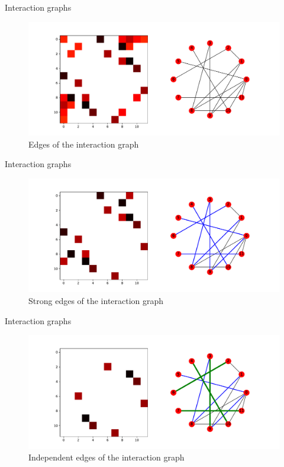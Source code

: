 \documentclass{beamer}
\theoremstyle{plain}
\theoremstyle{remark}
\begin{document}
\begin{frame}{Interaction graphs}
\begin{figure}[h]
	\centering
	\includegraphics[width=\linewidth]{interaction_matrix_edges.pdf}
	\caption{Edges of the interaction graph}
\end{figure}
\end{frame}

\begin{frame}{Interaction graphs}
\begin{figure}[h]
	\centering
	\includegraphics[width=\linewidth]{interaction_matrix_strong_edges.pdf}
	\caption{Strong edges of the interaction graph}
\end{figure}
\end{frame}

\begin{frame}{Interaction graphs}
\begin{figure}[h]
	\centering
	\includegraphics[width=\linewidth]{interaction_matrix_independent_edges.pdf}
	\caption{Independent edges of the interaction graph}
\end{figure}
\end{frame}
\end{document}
